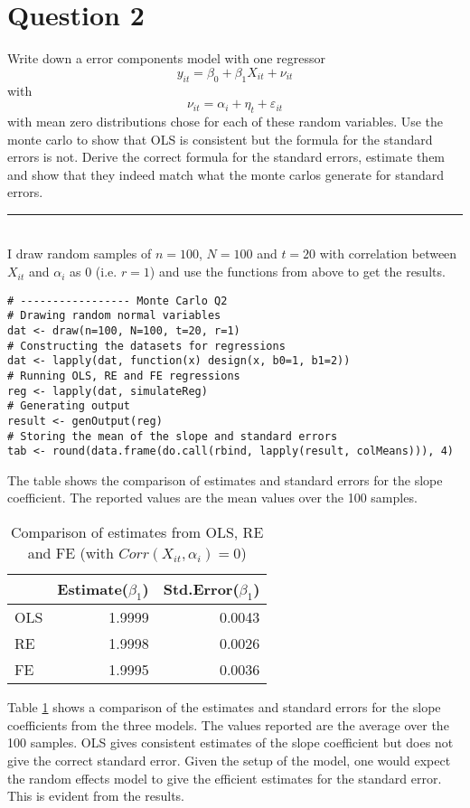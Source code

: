 \documentclass{article}
\newcommand{\floatintro}[1]{
  
  \vspace*{0.1in}
  
  {\footnotesize

    #1
    
  }
  
  \vspace*{0.1in} } \newcommand{\myrule}{\noindent\rule{16cm}{0.5pt}}
\begin{document}
\section*{Question 2}
Write down a error components model with one regressor
\begin{equation}
  \label{eq:1}
  y_{it} = \beta_0 + \beta_1 X_{it} + \nu_{it}
\end{equation}
with
\begin{equation}
  \label{eq:2}
  \nu_{it} = \alpha_i + \eta_t + \varepsilon_{it}
\end{equation}
with mean zero distributions chose for each of these random
variables. Use the monte carlo to show that OLS is consistent but the
formula for the standard errors is not. Derive the correct formula for
the standard errors, estimate them and show that they indeed match
what the monte carlos generate for standard errors.\\ \myrule\\
I draw random samples of $n=100$, $N=100$ and $t=20$ with correlation
between $X_{it}$ and $\alpha_i$ as 0 (i.e. $r=1$) and use the
functions from above to get the results.
\begin{verbatim}
# ----------------- Monte Carlo Q2
# Drawing random normal variables
dat <- draw(n=100, N=100, t=20, r=1)
# Constructing the datasets for regressions
dat <- lapply(dat, function(x) design(x, b0=1, b1=2))
# Running OLS, RE and FE regressions
reg <- lapply(dat, simulateReg)
# Generating output
result <- genOutput(reg)
# Storing the mean of the slope and standard errors
tab <- round(data.frame(do.call(rbind, lapply(result, colMeans))), 4)
\end{verbatim}
\begin{table}[htbp]
  \floatintro{The table shows the comparison of estimates and standard
    errors for the slope coefficient. The reported values are the mean
    values over the 100 samples.}
  \centering
  \begin{tabular}{lrr}
    \hline
    & Estimate($\beta_1$) & Std.Error($\beta_1$) \\ 
    \hline
    OLS & 1.9999 & 0.0043 \\ 
    RE & 1.9998 & 0.0026 \\ 
    FE & 1.9995 & 0.0036 \\ 
    \hline
  \end{tabular}
  \caption{Comparison of estimates from OLS, RE and FE (with
    $Corr(X_{it}, \alpha_i)=0$)}
  \label{tab:q2}
\end{table}
Table \ref{tab:q2} shows a comparison of the estimates and standard
errors for the slope coefficients from the three models. The values
reported are the average over the 100 samples. OLS gives consistent
estimates of the slope coefficient but does not give the correct
standard error. Given the setup of the model, one would expect the
random effects model to give the efficient estimates for the standard
error. This is evident from the results. 
\end{document}
